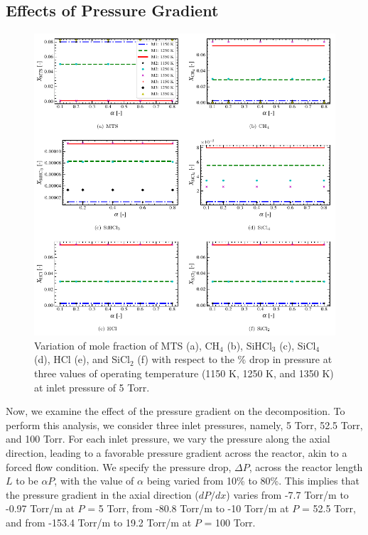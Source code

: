 \documentclass[final, letterpaper, square, comma, numbers, sort&compress]{elsarticle}
\begin{document}
\subsection{Effects of Pressure Gradient}
\begin{figure}[p]
    \centering\includegraphics[width=\textwidth]{ph-fig10.png}
    \caption{Variation of mole fraction of MTS (a), CH$_4$ (b), SiHCl$_3$ (c), SiCl$_4$ (d), HCl (e), and SiCl$_2$ (f) with respect to the \% drop in pressure at three values of operating temperature (1150 K, 1250 K, and 1350 K) at inlet pressure of 5 Torr.}
    \label{fig:10}
\end{figure}

Now, we examine the effect of the pressure gradient on the decomposition. To perform this analysis, we consider three inlet pressures, namely, 5 Torr, 52.5 Torr, and 100 Torr. For each inlet pressure, we vary the pressure along the axial direction, leading to a favorable pressure gradient across the reactor, akin to a forced flow condition. We specify the pressure drop, $\Delta P$, across the reactor length $L$ to be $\alpha P$, with the value of $\alpha$ being varied from 10\% to 80\%. This implies that the pressure gradient in the axial direction ($dP/dx$) varies from -7.7 Torr/m to -0.97 Torr/m at $P$ = 5 Torr, from -80.8 Torr/m to -10 Torr/m at $P$ = 52.5 Torr, and from -153.4 Torr/m to 19.2 Torr/m at $P$ = 100 Torr.
\end{document}
